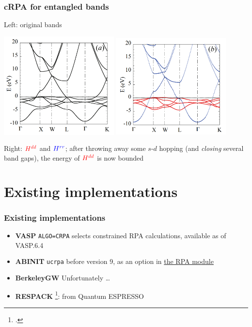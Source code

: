 \documentclass{beamer}
\newcommand{\xmark}{\ding{55}}%
\newcommand{\shortcode}[1]{\texttt{#1}}
\begin{document}
\begin{frame}
\frametitle{cRPA for entangled bands}

Left: original bands

\begin{center}
    \includegraphics[width=0.45\textwidth]{plots/ni-bands-1.PNG}
    \includegraphics[width=0.45\textwidth]{plots/ni-bands-no-entanble-1.PNG}
\end{center}

Right: $\textcolor{red}{H^{dd}}$ and $\textcolor{blue}{H^{rr}}$;
after throwing away some $s$-$d$ hopping 
(and \emph{closing} several band gaps), 
the energy of $\textcolor{red}{H^{dd}}$ is now bounded

\end{frame}

\section{Existing implementations}

\begin{frame}
\frametitle{Existing implementations}

\begin{itemize}
    \item \textbf{VASP}    
    \shortcode{ALGO=CRPA} selects constrained RPA calculations, 
    available as of VASP.6.4
    \item \textbf{ABINIT} 
    \shortcode{ucrpa} before version 9, 
    as an option in \href{https://docs.abinit.org/variables/gw/\#ucrpa}{the RPA module}
    \item \textbf{BerkeleyGW} \xmark Unfortunately \dots
    \item \textbf{RESPACK} \footcite{nakamura2021respack}: from Quantum ESPRESSO
\end{itemize}

\end{frame}
\end{document}
